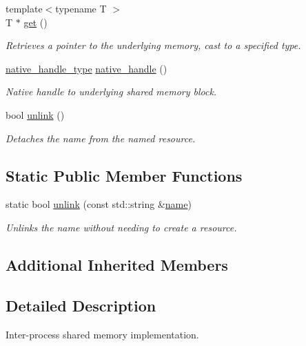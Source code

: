 \begin{DoxyCompactItemize}
{\footnotesize template$<$typename T $>$ }\\T $\ast$ \hyperlink{classcpen333_1_1process_1_1windows_1_1shared__memory_a3986cdc917b26ab1ab608f59270a47c5}{get} ()
\begin{DoxyCompactList}\small\item\em Retrieves a pointer to the underlying memory, cast to a specified type. \end{DoxyCompactList}\item 
\hyperlink{classcpen333_1_1process_1_1windows_1_1shared__memory_a4a2507680675101666846b0975fa6899}{native\+\_\+handle\+\_\+type} \hyperlink{classcpen333_1_1process_1_1windows_1_1shared__memory_a1827dd03341d7c6afcc02cf078f54e32}{native\+\_\+handle} ()
\begin{DoxyCompactList}\small\item\em Native handle to underlying shared memory block. \end{DoxyCompactList}\item 
bool \hyperlink{classcpen333_1_1process_1_1windows_1_1shared__memory_aa6efdc9a3e1310ea69ecc48aeb41286c}{unlink} ()
\begin{DoxyCompactList}\small\item\em Detaches the name from the named resource. \end{DoxyCompactList}\end{DoxyCompactItemize}
\subsection*{Static Public Member Functions}
\begin{DoxyCompactItemize}
\item 
static bool \hyperlink{classcpen333_1_1process_1_1windows_1_1shared__memory_a99c4766a9995a97595bba1550256f1c9}{unlink} (const std\+::string \&\hyperlink{classcpen333_1_1process_1_1impl_1_1named__resource__base_a53986a0a1dd26a3602b842c45613b79d}{name})
\begin{DoxyCompactList}\small\item\em Unlinks the name without needing to create a resource. \end{DoxyCompactList}\end{DoxyCompactItemize}
\subsection*{Additional Inherited Members}


\subsection{Detailed Description}
Inter-\/process shared memory implementation. 

